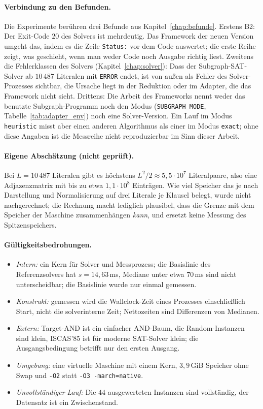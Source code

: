 \paragraph{Verbindung zu den Befunden.} Die Experimente berühren drei Befunde aus Kapitel~\ref{chap:befunde}. Erstens B2: Der Exit-Code $20$ des Solvers ist mehrdeutig. Das Framework der neuen Version umgeht das, indem es die Zeile \texttt{Status:} vor dem Code auswertet; die erste Reihe zeigt, was geschieht, wenn man weder Code noch Ausgabe richtig liest. Zweitens die Fehlerklassen des Solvers (Kapitel~\ref{chap:solver}): Dass der Subgraph-SAT-Solver ab $10\,487$ Literalen mit \texttt{ERROR} endet, ist von außen als Fehler des Solver-Prozesses sichtbar, die Ursache liegt in der Reduktion oder im Adapter, die das Framework nicht sieht. Drittens: Die Arbeit des Frameworks nennt weder das benutzte Subgraph-Programm noch den Modus (\texttt{SUBGRAPH\_MODE}, Tabelle~\ref{tab:adapter_env}) noch eine Solver-Version. Ein Lauf im Modus \texttt{heuristic} misst aber einen anderen Algorithmus als einer im Modus \texttt{exact}; ohne diese Angaben ist die Messreihe nicht reproduzierbar im Sinn dieser Arbeit.

\paragraph{Eigene Abschätzung (nicht geprüft).} Bei $L=10\,487$ Literalen gibt es höchstens $L^2/2\approx5{,}5\cdot10^{7}$ Literalpaare, also eine Adjazenzmatrix mit bis zu etwa $1{,}1\cdot10^{8}$ Einträgen. Wie viel Speicher das je nach Darstellung und Normalisierung auf drei Literale je Klausel belegt, wurde nicht nachgerechnet; die Rechnung macht lediglich plausibel, dass die Grenze mit dem Speicher der Maschine zusammenhängen \emph{kann}, und ersetzt keine Messung des Spitzenspeichers.

\paragraph{Gültigkeitsbedrohungen.}
\begin{itemize}
	\item \emph{Intern:} ein Kern für Solver und Messprozess; die Basislinie des Referenzsolvers hat $s=14{,}63$\,ms, Mediane unter etwa $70$\,ms sind nicht unterscheidbar; die Basislinie wurde nur einmal gemessen.
	\item \emph{Konstrukt:} gemessen wird die Wallclock-Zeit eines Prozesses einschließlich Start, nicht die solverinterne Zeit; Nettozeiten sind Differenzen von Medianen.
	\item \emph{Extern:} Target-AND ist ein einfacher AND-Baum, die Random-Instanzen sind klein, ISCAS'85 ist für moderne SAT-Solver klein; die Ausgangsbedingung betrifft nur den ersten Ausgang.
	\item \emph{Umgebung:} eine virtuelle Maschine mit einem Kern, $3{,}9$\,GiB Speicher ohne Swap und \texttt{-O2} statt \texttt{-O3 -march=native}.
	\item \emph{Unvollständiger Lauf:} Die $44$ ausgewerteten Instanzen sind vollständig, der Datensatz ist ein Zwischenstand.
\end{itemize}

